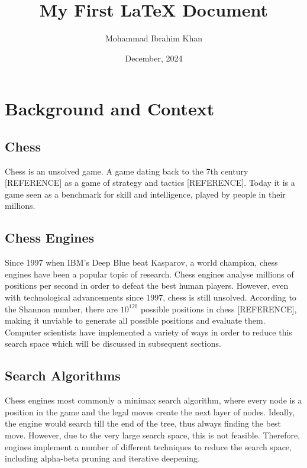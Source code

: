 \documentclass{article}
\title{My First LaTeX Document}
\author{Mohammad Ibrahim Khan}
\date{December, 2024}
\begin{document}
\maketitle

\tableofcontents
\listoffigures
\listoftables

\section{Background and Context}
\label{sec:background}

\subsection{Chess}
\label{sec:chess}
Chess is an unsolved game. A game dating back to the 7th century [REFERENCE] as a 
game of strategy and tactics [REFERENCE]. Today it is a game seen as a benchmark for skill and intelligence,
played by people in their millions. 

\subsection{Chess Engines}
\label{sec:engines}
Since 1997 when IBM's Deep Blue beat Kasparov, a world champion, chess engines have been a 
popular topic of research. Chess engines analyse millions of positions per second in order to defeat
the best human players. However, even with technological advancements since 1997, chess is still
unsolved. According to the Shannon number, there are $10^{120}$ possible positions in chess [REFERENCE],
making it unviable to generate all possible positions and evaluate them. Computer scientists have
implemented a variety of ways in order to reduce this search space which will be discussed in subsequent
sections.

\subsection{Search Algorithms}
\label{sec:search}
Chess engines most commonly a minimax search algorithm, where every node is a position
in the game and the legal moves create the next layer of nodes. Ideally, the engine would search
till the end of the tree, thus always finding the best move. However, due to the very large search space,
this is not feasible. Therefore, engines implement a number of different techniques to reduce the search space, including
alpha-beta pruning and iterative deepening.
\end{document}
